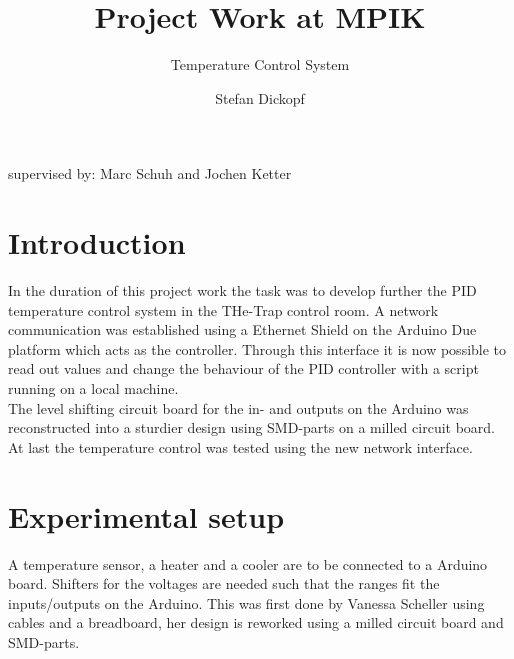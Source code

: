 \documentclass[12pt]{scrartcl}
\begin{document}
  \title{Project Work at MPIK}
  \subtitle{Temperature Control System}
  \date{}
  \author{Stefan Dickopf}
  \maketitle
  \vspace{50pt} {\centering supervised by: Marc Schuh and Jochen Ketter\\}
  \thispagestyle{empty}
  \clearpage
  \tableofcontents
  \thispagestyle{empty}
  \clearpage
  \setcounter{page}{1}

  \section{Introduction}
    In the duration of this project work the task was to develop further the PID
    temperature control system in the THe-Trap control room.
    A network communication was established using a Ethernet Shield on
    the Arduino Due platform which acts as the controller. Through this
    interface it is now possible to read out values and change the behaviour
    of the PID controller with a script running on a local machine.\\
    The level shifting circuit board for the in- and outputs on the Arduino
    was reconstructed into a sturdier design using SMD-parts on a milled
    circuit board.\\
    \indent At last the temperature control was tested using the new network interface.

  \section{Experimental setup}
    A temperature sensor, a heater and a cooler are to be connected to a Arduino
    board. Shifters for the voltages are needed such that the
    ranges fit the inputs/outputs on the Arduino. This was first done by
    Vanessa Scheller using cables and a breadboard, her design is reworked
    using a milled circuit board and SMD-parts.
\end{document}

